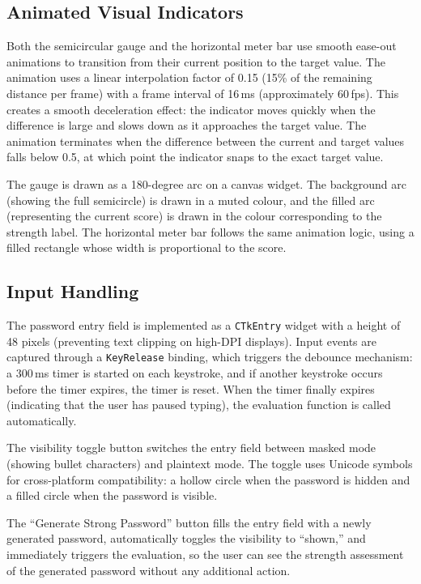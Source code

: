 \subsection{Animated Visual Indicators}

Both the semicircular gauge and the horizontal meter bar use smooth ease-out animations to transition from their current position to the target value. The animation uses a linear interpolation factor of 0.15 (15\% of the remaining distance per frame) with a frame interval of 16\,ms (approximately 60\,fps). This creates a smooth deceleration effect: the indicator moves quickly when the difference is large and slows down as it approaches the target value. The animation terminates when the difference between the current and target values falls below 0.5, at which point the indicator snaps to the exact target value.

The gauge is drawn as a 180-degree arc on a canvas widget. The background arc (showing the full semicircle) is drawn in a muted colour, and the filled arc (representing the current score) is drawn in the colour corresponding to the strength label. The horizontal meter bar follows the same animation logic, using a filled rectangle whose width is proportional to the score.

\subsection{Input Handling}

The password entry field is implemented as a \texttt{CTkEntry} widget with a height of 48 pixels (preventing text clipping on high-DPI displays). Input events are captured through a \texttt{KeyRelease} binding, which triggers the debounce mechanism: a 300\,ms timer is started on each keystroke, and if another keystroke occurs before the timer expires, the timer is reset. When the timer finally expires (indicating that the user has paused typing), the evaluation function is called automatically.

The visibility toggle button switches the entry field between masked mode (showing bullet characters) and plaintext mode. The toggle uses Unicode symbols for cross-platform compatibility: a hollow circle when the password is hidden and a filled circle when the password is visible.

The ``Generate Strong Password'' button fills the entry field with a newly generated password, automatically toggles the visibility to ``shown,'' and immediately triggers the evaluation, so the user can see the strength assessment of the generated password without any additional action.

